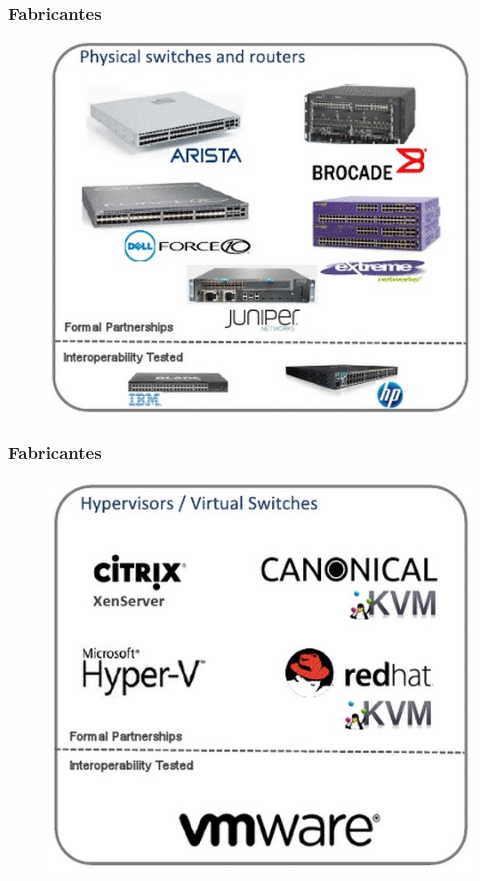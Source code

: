 %
%
\begin{frame}\frametitle{Fabricantes}

	\begin{figure}[h]
        \centering
        \includegraphics[scale=0.4]{images/of-vendors.png}
    \end{figure}
\end{frame}



%
%
\begin{frame}\frametitle{Fabricantes}

	\begin{figure}[h]
        \centering
        \includegraphics[scale=0.4]{images/of-virtual-vendors.png}
    \end{figure}
\end{frame}


